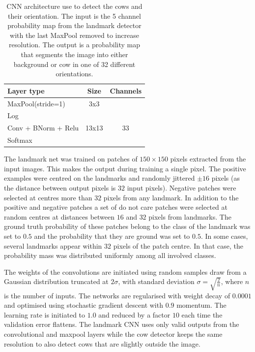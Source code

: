 \documentclass[10pt,a4paper,twocolumn]{article}
\begin{document}
\begin{table}
\begin{center}
\begin{tabular}{|l|c|c|}
\hline
\textbf{Layer type} & \textbf{Size} & \textbf{Channels} \\
\hline

MaxPool(stride=1) & 3x3 &  \\
Log & & \\
Conv + BNorm + Relu & 13x13 & 33 \\
Softmax & & \\
\hline
\end{tabular}
\end{center}
\caption{CNN architecture use to detect the cows and their orientation. The input is the 5 channel probability map from the landmark detector with the last MaxPool removed to increase resolution. The output is a probability map that segments the image into either background or cow in one of 32 different orientations.}
\label{tab:cowdirnet}
\end{table}

The landmark net was trained on patches of $150\times 150$ pixels extracted from the input images. This makes the output during training a single pixel. The positive examples were centred on the landmarks and randomly jittered $\pm 16$ pixels (as the distance between output pixels is $32$ input pixels). Negative patches were selected at centres more than $32$ pixels from any landmark. In addition to the positive and negative patches a set of do not care patches were selected at random centres at distances between $16$ and $32$ pixels from landmarks. The ground truth probability of these patches belong to the class of the landmark was set to $0.5$ and the probability that they are ground was set to $0.5$. In some cases, several landmarks appear within $32$ pixels of the patch centre. In that case, the probability mass was distributed uniformly among all involved classes.

The weights of the convolutions are initiated using random samples draw from a Gaussian
distribution truncated at $2\sigma$, with standard deviation $\sigma=\sqrt{\frac{2}{n}}$,
where $n$ is the number of inputs\cite{DBLP:journals/corr/HeZR015}. The networks are regularised with weight decay of
$0.0001$ and optimised using stochastic gradient descent with $0.9$ momentum. The
learning rate is initiated to $1.0$ and reduced by a factor $10$ each time the validation
error flattens. The landmark CNN uses only valid outputs from the convolutional and maxpool
layers while the cow detector keeps the same resolution to also detect cows that are
slightly outside the image.
\end{document}
